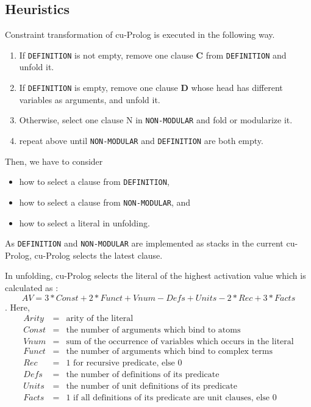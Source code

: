 \subsection{Heuristics}
Constraint transformation of cu-Prolog is executed in the following
way. 
\begin{enumerate}
\item If {\tt DEFINITION} is not empty, remove one clause {\bf C} from
{\tt DEFINITION} and unfold it.

\item If {\tt DEFINITION} is empty, remove one clause {\bf D} whose
head has different variables as arguments, and unfold it.

\item Otherwise, select one clause N in {\tt NON-MODULAR} and fold or
modularize it.

\item repeat above until {\tt NON-MODULAR} and {\tt DEFINITION} are
both empty.

\end{enumerate}

Then, we have to consider
\begin{itemize}
\item how to select a clause from {\tt DEFINITION}, 
\item how to select a clause from {\tt NON-MODULAR}, and 
\item how to select a literal in unfolding.
\end{itemize}

As {\tt DEFINITION} and {\tt NON-MODULAR} 
are implemented as stacks in the current cu-Prolog, 
cu-Prolog selects the latest clause.

In unfolding, cu-Prolog selects the literal of the highest activation
value which is calculated as :
\[ AV = 3*Const + 2*Funct + Vnum - Defs + Units - 2*Rec + 3*Facts\].
Here,
\begin{eqnarray*}
Arity & = & \mbox{arity of the literal}\\
Const & = & \mbox{the number of arguments which bind to atoms}\\
Vnum  & = & \mbox{sum of the occurrence of variables which occurs in the literal}\\
Funct & = & \mbox{the number of arguments which bind to complex terms}\\
Rec   & = & \mbox{1 for recursive predicate, else 0} \\
Defs  & = & \mbox{the number of definitions of its predicate}\\
Units & = & \mbox{the number of unit definitions of its predicate}\\
Facts & = & \mbox{1 if all definitions of its predicate are unit clauses, else 0}\\
\end{eqnarray*}


